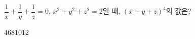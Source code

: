 $\dfrac{1}{x}+\dfrac{1}{y}+\dfrac{1}{z}=0$, $x^2+y^2+z^2=2$일 때, $(x+y+z)^4$의 값은?
\begin{choices32}{$4$}{$6$}{$8$}{$10$}{$12$}\end{choices32}
